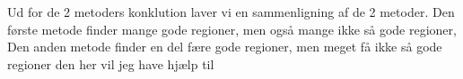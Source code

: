 Ud for de 2 metoders konklution laver vi en sammenligning af de 2 metoder. Den første metode finder mange gode regioner, men også mange ikke så gode regioner, Den anden metode finder en del fære gode regioner, men meget få ikke så gode regioner
den her vil jeg have hjælp til





